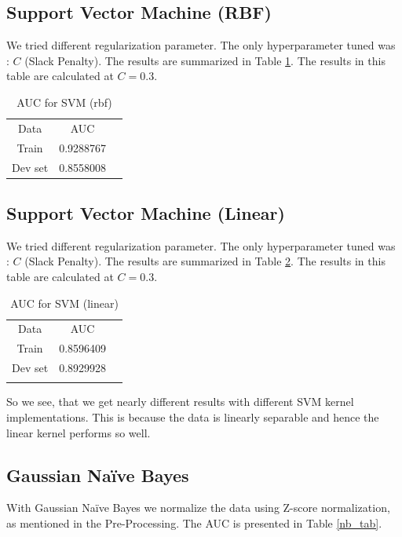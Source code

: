 \documentclass[conference]{IEEEtran}
\numberwithin{equation}{section}
\numberwithin{figure}{section}
\numberwithin{table}{section}
\begin{document}
\subsection{Support Vector Machine (RBF)}
We tried different regularization parameter. The only hyperparameter tuned was : \textit{$C$} (Slack Penalty). The results are summarized in Table \ref{tab_svm2}. The results in this table are calculated at $C = 0.3$.

\begin{table}[!htb]
 \centering
 \caption{AUC for SVM (rbf)}
 \label{tab_svm2}
\begin{tabular}{ c c c } 
	    \noalign{\smallskip}\hline\noalign{\smallskip}
		Data &   AUC \\
    	   \noalign{\smallskip}\hline\noalign{\smallskip}
		Train & 0.9288767\\
		Dev set & 0.8558008\\
		
  \end{tabular} 
\end{table}

\subsection{Support Vector Machine (Linear)}
We tried different regularization parameter. The only hyperparameter tuned was : \textit{$C$} (Slack Penalty). The results are summarized in Table \ref{tab_svm}.  The results in this table are calculated at $C = 0.3$.

\begin{table}[!htb]
 \centering
 \caption{AUC for SVM (linear)}
 \label{tab_svm}
\begin{tabular}{ c c c } 
	    \noalign{\smallskip}\hline\noalign{\smallskip}
		Data &   AUC \\
    	   \noalign{\smallskip}\hline\noalign{\smallskip}
		Train & 0.8596409\\
		Dev set & 0.8929928\\
			    \noalign{\smallskip}\hline\noalign{\smallskip}
  \end{tabular} 
\end{table}

So we see, that we get nearly different results with different SVM kernel implementations. This is because the data is linearly separable and hence the linear kernel performs so well.

\subsection{Gaussian Na{\"i}ve Bayes}
With Gaussian Na{\"i}ve Bayes we normalize the data using Z-score normalization, as mentioned in the Pre-Processing. The AUC is presented in Table \ref{nb_tab}.
\end{document}
